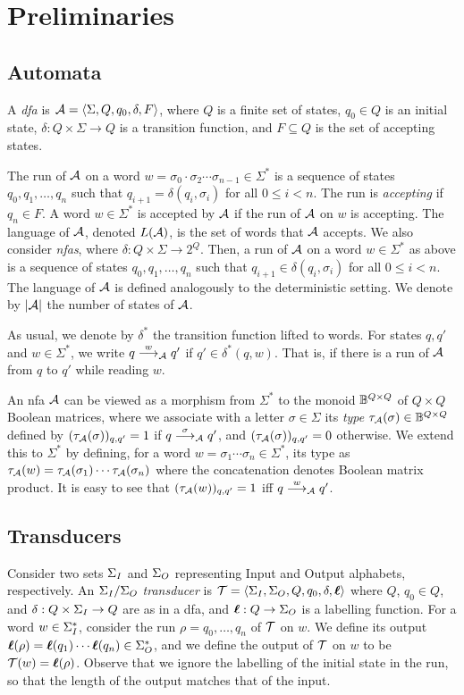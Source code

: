 \chapter{Preliminaries}
\label{chap:prelims}

\section*{Automata}
A \emph{\gls{dfa}} is $\mathcal{A}=\left< \Sigma,Q,q_0,\delta,F\right>$, where $Q$ is a finite set of states, $q_0 \in Q$ is an initial state, $\delta: Q\times \Sigma \to Q$ is a transition function, and $F\subseteq Q$ is the set of accepting states. 

The run of $\mathcal{A}$ on a word $w=\sigma_0 \cdot \sigma_2 \cdots \sigma_{n-1}\in \Sigma^*$ is a sequence of states $q_0,q_1,\ldots,q_n$ such that $q_{i+1} = \delta(q_i,\sigma_{i})$ for all $0\le i<n$. 
The run is \emph{accepting} if $q_n\in F$. A word $w \in \Sigma^*$ is accepted by $\mathcal{A}$ if the run of $\mathcal{A}$ on $w$ is accepting. The language of $\mathcal{A}$, denoted $L(\mathcal{A})$, is the set of words that $\mathcal{A}$ accepts. 
We also consider \emph{\glspl{nfa}}, where $\delta:Q\times \Sigma\to 2^Q$. Then, a run of $\mathcal{A}$ on a word $w\in \Sigma^*$ as above is a sequence of states $q_0,q_1,\ldots,q_n$ such that $q_{i+1} \in \delta(q_i,\sigma_{i})$ for all $0\le i<n$. The language of $\mathcal{A}$ is defined analogously to the deterministic setting.
We denote by $|\mathcal{A}|$ the number of states of $\mathcal{A}$.

As usual, we denote by $\delta^*$ the transition function lifted to words.
For states $q,q'$ and $w\in \Sigma^*$, we write $q\stackrel{w}{\longrightarrow}_{\mathcal{A}}q'$ if $q'\in \delta^*(q,w)$. That is, if there is a run of $\mathcal{A}$ from $q$ to $q'$ while reading $w$.

An \gls{nfa} $\mathcal{A}$ can be viewed as a morphism from $\Sigma^*$ to the monoid $\mathbb{B}^{Q\times Q}$ of $Q\times Q$ Boolean matrices, where we associate with a letter $\sigma\in \Sigma$ its \emph{type} $\tau_{\mathcal{A}}(\sigma)\in \mathbb{B}^{Q\times Q}$ defined by $(\tau_{\mathcal{A}}(\sigma))_{q,q'}=1$ if $q\stackrel{\sigma}{\longrightarrow}_{\mathcal{A}}q'$, and $(\tau_{\mathcal{A}}(\sigma))_{q,q'}=0$ otherwise. We extend this to $\Sigma^*$ by defining, for a word $w=\sigma_1\cdots \sigma_n\in \Sigma^*$, its type as $\tau_{\mathcal{A}}(w)=\tau_{\mathcal{A}}(\sigma_1)\cdots \tau_{\mathcal{A}}(\sigma_n)$ where the concatenation denotes Boolean matrix product. It is easy to see that $(\tau_{\mathcal{A}}(w))_{q,q'}=1$ iff $q\stackrel{w}{\longrightarrow}_{\mathcal{A}}q'$.

\section*{Transducers}
Consider two sets $\Sigma_{I}$ and $\Sigma_{O}$ representing Input and Output alphabets, respectively. An \emph{$\Sigma_{I}/\Sigma_{O}$ transducer} is $\mathcal{T}=\left< \Sigma_{I},\Sigma_{O},Q,q_0,\delta,\boldsymbol{\ell}\right>$ where $Q$, $q_0\in Q$, and $\delta:Q\times \Sigma_{I}\to Q$ are as in a \gls{dfa}, and $\boldsymbol{\ell}:Q\to \Sigma_{O}$ is a labelling function. For a word $w\in \Sigma_{I}^*$, consider the run $\rho=q_0,\ldots,q_n$ of $\mathcal{T}$ on $w$. We define its output $\boldsymbol{\ell}(\rho)=\boldsymbol{\ell}(q_1)\cdots\boldsymbol{\ell}(q_n)\in \Sigma_{O}^*$, and we define the output of $\mathcal{T}$ on $w$ to be $\mathcal{T}(w)=\boldsymbol{\ell}(\rho)$. Observe that we ignore the labelling of the initial state in the run, so that the length of the output matches that of the input.


